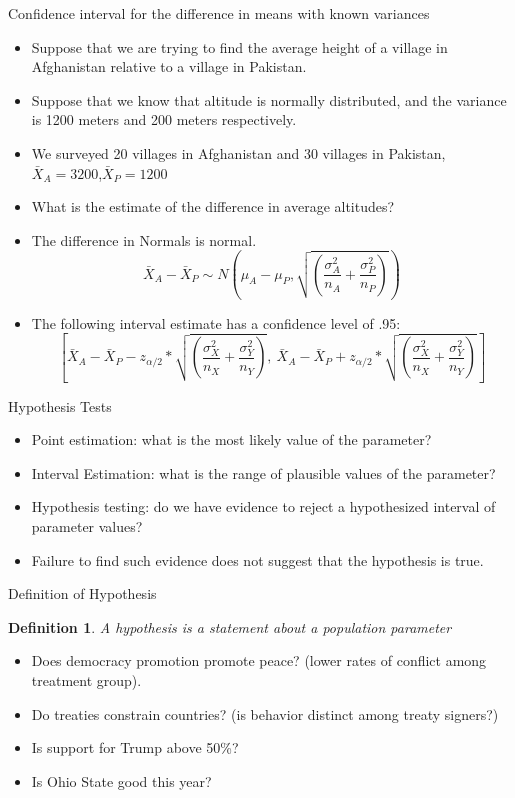 \documentclass{beamer}
\newtheorem{defn}{Definition}
\numberwithin{equation}{section}
\begin{document}
\begin{frame}{Confidence interval for the difference in means with known variances}
\begin{itemize}
\item Suppose that we are trying to find the average height of a village in Afghanistan relative to a village in Pakistan.\pause
\item Suppose that we know that altitude is normally distributed, and the variance is 1200 meters and 200 meters respectively. \pause
\item We surveyed 20 villages in Afghanistan and 30 villages in Pakistan, $\bar{X}_A= 3200$,$\bar{X}_P= 1200$ \pause
\item What is the estimate of the difference in average altitudes?\pause
\item The difference in Normals is normal.  $$\bar{X}_A-\bar{X}_P\sim N\left(\mu_A-\mu_P, \sqrt{(\frac{\sigma^2_A}{n_A}+\frac{\sigma^2_P}{n_P})}\right)$$
\item The following interval \alert{estimate} has a confidence level of .95:
$$[\bar{X}_A-\bar{X}_P-z_{\alpha/2} *\sqrt{(\frac{\sigma^2_X}{n_X}+\frac{\sigma^2_Y}{n_Y})},\ \bar{X}_A-\bar{X}_P+z_{\alpha/2}*\sqrt{(\frac{\sigma^2_X}{n_X}+\frac{\sigma^2_Y}{n_Y})}]$$


\end{itemize}
\end{frame}

\begin{frame}{Hypothesis Tests}
\begin{itemize}
\item Point estimation: what is the most likely value of the parameter?
\item Interval Estimation: what is the range of plausible values of the parameter?
\item Hypothesis testing: do we have evidence to reject a hypothesized interval of parameter values?
\item Failure to find such evidence does not suggest that the hypothesis is true.
\end{itemize}
\end{frame}


\begin{frame}{Definition of Hypothesis}
\begin{defn}
A \alert{hypothesis} is a statement about a population parameter
\end{defn}\pause
\begin{itemize}
\item Does democracy promotion promote peace? (lower rates of conflict among treatment group).\pause
\item Do treaties constrain countries? (is behavior distinct among treaty signers?)\pause
\item Is support for Trump above 50\%?\pause
\item Is Ohio State good this year?
\end{itemize}
\end{frame}
\end{document}
